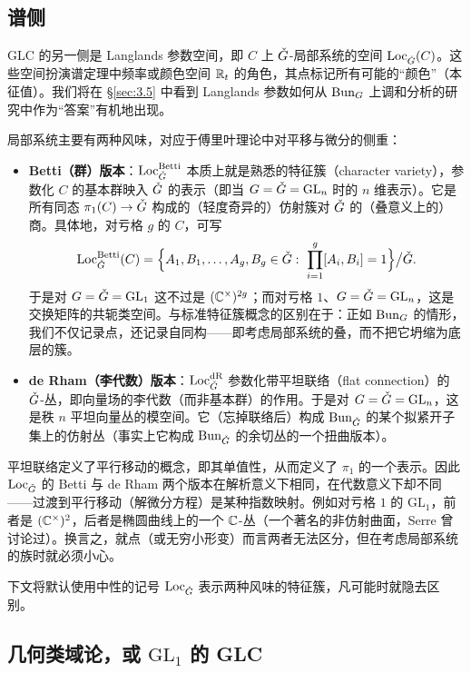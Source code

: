 \subsection{谱侧}\label{sec:2.3}

GLC 的另一侧是 Langlands 参数空间，即 $C$ 上 $\check{G}$-局部系统的空间 $\operatorname{Loc}_{\check{G}}(C)$。这些空间扮演谱定理中频率或颜色空间 $\mathbb{R}_{t}$ 的角色，其点标记所有可能的“颜色”（本征值）。我们将在 \S\ref{sec:3.5} 中看到 Langlands 参数如何从 $\operatorname{Bun}_{G}$ 上调和分析的研究中作为“答案”有机地出现。

局部系统主要有两种风味，对应于傅里叶理论中对平移与微分的侧重：

\begin{itemize}
\item \textbf{Betti（群）版本}：$\operatorname{Loc}^{\mathrm{Betti}}_{\check{G}}$ 本质上就是熟悉的特征簇（character variety），参数化 $C$ 的基本群映入 $\check{G}$ 的表示（即当 $G=\check{G}=\mathrm{GL}_{n}$ 时的 $n$ 维表示）。它是所有同态 $\pi_{1}(C)\to\check{G}$ 构成的（轻度奇异的）仿射簇对 $\check{G}$ 的（叠意义上的）商。具体地，对亏格 $g$ 的 $C$，可写
\[
\Loc^{\Betti}_{\Gd}(C)=\Bigl\{A_{1},B_{1},\dots,A_{g},B_{g}\in\Gd:\ \prod_{i=1}^{g}[A_{i},B_{i}]=1\Bigr\}\big/\Gd.
\]
于是对 $G=\check{G}=\mathrm{GL}_{1}$ 这不过是 $(\mathbb{C}^{\times})^{2g}$；而对亏格 $1$、$G=\check{G}=\mathrm{GL}_{n}$，这是交换矩阵的共轭类空间。与标准特征簇概念的区别在于：正如 $\operatorname{Bun}_{G}$ 的情形，我们不仅记录点，还记录自同构——即考虑局部系统的叠，而不把它坍缩为底层的簇。
\item \textbf{de Rham（李代数）版本}：$\operatorname{Loc}^{\mathrm{dR}}_{\check{G}}$ 参数化带平坦联络（flat connection）的 $\check{G}$-丛，即向量场的李代数（而非基本群）的作用。于是对 $G=\check{G}=\mathrm{GL}_{n}$，这是秩 $n$ 平坦向量丛的模空间。它（忘掉联络后）构成 $\operatorname{Bun}_{\check{G}}$ 的某个拟紧开子集上的仿射丛（事实上它构成 $\operatorname{Bun}_{\check{G}}$ 的余切丛的一个扭曲版本）。
\end{itemize}

平坦联络定义了平行移动的概念，即其单值性，从而定义了 $\pi_{1}$ 的一个表示。因此 $\operatorname{Loc}_{\check{G}}$ 的 Betti 与 de Rham 两个版本在解析意义下相同，在代数意义下却不同——过渡到平行移动（解微分方程）是某种指数映射。例如对亏格 $1$ 的 $\mathrm{GL}_{1}$，前者是 $(\mathbb{C}^{\times})^{2}$，后者是椭圆曲线上的一个 $\mathbb{C}$-丛（一个著名的非仿射曲面，Serre 曾讨论过）。换言之，就点（或无穷小形变）而言两者无法区分，但在考虑局部系统的族时就必须小心。

下文将默认使用中性的记号 $\operatorname{Loc}_{\check{G}}$ 表示两种风味的特征簇，凡可能时就隐去区别。

\subsection{几何类域论，或 $\mathrm{GL}_{1}$ 的 GLC}\label{sec:2.4}

